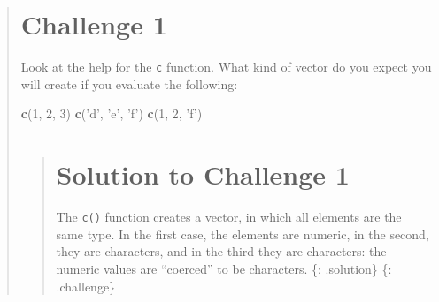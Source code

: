 \documentclass[]{book}
\newenvironment{Shaded}{\begin{snugshade}}{\end{snugshade}}
\newcommand{\KeywordTok}[1]{\textcolor[rgb]{0.13,0.29,0.53}{\textbf{#1}}}
\newcommand{\DecValTok}[1]{\textcolor[rgb]{0.00,0.00,0.81}{#1}}
\newcommand{\StringTok}[1]{\textcolor[rgb]{0.31,0.60,0.02}{#1}}
\newcommand{\NormalTok}[1]{#1}
\begin{document}
\begin{quote}
\section{Challenge 1}\label{challenge-1-1}

Look at the help for the \texttt{c} function. What kind of vector do you
expect you will create if you evaluate the following:

\begin{Shaded}
\begin{Highlighting}[]
\KeywordTok{c}\NormalTok{(}\DecValTok{1}\NormalTok{, }\DecValTok{2}\NormalTok{, }\DecValTok{3}\NormalTok{)}
\KeywordTok{c}\NormalTok{(}\StringTok{'d'}\NormalTok{, }\StringTok{'e'}\NormalTok{, }\StringTok{'f'}\NormalTok{)}
\KeywordTok{c}\NormalTok{(}\DecValTok{1}\NormalTok{, }\DecValTok{2}\NormalTok{, }\StringTok{'f'}\NormalTok{)}
\end{Highlighting}
\end{Shaded}

\begin{quote}
\section{Solution to Challenge 1}\label{solution-to-challenge-1}

The \texttt{c()} function creates a vector, in which all elements are
the same type. In the first case, the elements are numeric, in the
second, they are characters, and in the third they are characters: the
numeric values are ``coerced'' to be characters. \{: .solution\} \{:
.challenge\}
\end{quote}
\end{quote}
\end{document}
